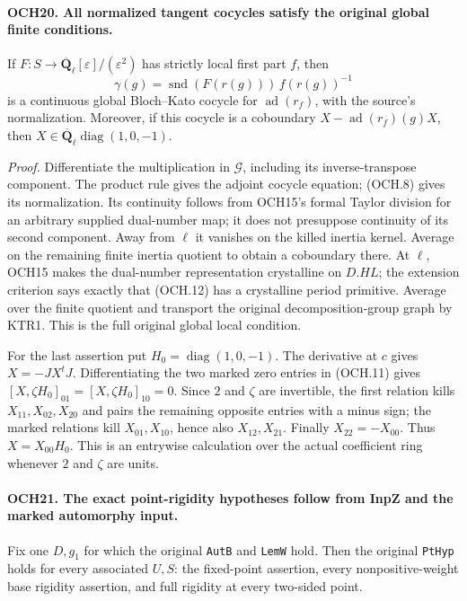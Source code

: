 \paragraph{OCH20. All normalized tangent cocycles satisfy the original global finite conditions.}
\label{claim:OCH20}
If \(F:S\to\overline{\mathbf Q}_\ell[\varepsilon]/(\varepsilon^2)\)
has strictly local first part \(f\), then
\[
       \gamma(g)=\operatorname{snd}(F(r(g)))\,
                         f(r(g))^{-1}
 \tag{OCH.12}
\]
is a continuous global Bloch--Kato cocycle for
\(\operatorname{ad}(r_f)\), with the source's normalization.
Moreover, if this cocycle is a coboundary
\(X-\operatorname{ad}(r_f)(g)X\), then
\(X\in\overline{\mathbf Q}_\ell\operatorname{diag}(1,0,-1)\).

\emph{Proof.}
Differentiate the multiplication in \(\mathcal G\), including
its inverse-transpose component.  The product rule gives the
adjoint cocycle equation; (OCH.8) gives its normalization.  Its
continuity follows from OCH15's formal Taylor division for an
arbitrary supplied dual-number map; it does not presuppose continuity
of its second component.  Away from \(\ell\) it vanishes
on the killed inertia kernel.  Average on the remaining finite
inertia quotient to obtain a coboundary there.  At \(\ell\),
OCH15 makes the dual-number representation crystalline on
\(D.HL\); the extension criterion says exactly that (OCH.12)
has a crystalline period primitive.  Average over the finite
quotient and transport the original decomposition-group graph by
KTR1.  This is the full original global local condition.

For the last assertion put \(H_0=\operatorname{diag}(1,0,-1)\).
The derivative at \(c\) gives \(X=-JX^tJ\).
Differentiating the two marked zero entries in (OCH.11) gives
\([X,\zeta H_0]_{01}=[X,\zeta H_0]_{10}=0\).
Since \(2\) and \(\zeta\) are invertible, the first relation
kills \(X_{11},X_{02},X_{20}\) and pairs the remaining opposite
entries with a minus sign; the marked relations kill
\(X_{01},X_{10}\), hence also \(X_{12},X_{21}\).
Finally \(X_{22}=-X_{00}\).  Thus \(X=X_{00}H_0\).
This is an entrywise calculation over the actual coefficient ring
whenever \(2\) and \(\zeta\) are units.

\paragraph{OCH21. The exact point-rigidity hypotheses follow from InpZ and the marked automorphy input.}
\label{claim:OCH21}
Fix one \(D,g_1\) for which the original \texttt{AutB} and
\texttt{LemW} hold.  Then the original \texttt{PtHyp} holds for
every associated \(U,S\): the fixed-point assertion, every
nonpositive-weight base rigidity assertion, and full rigidity at
every two-sided point.

